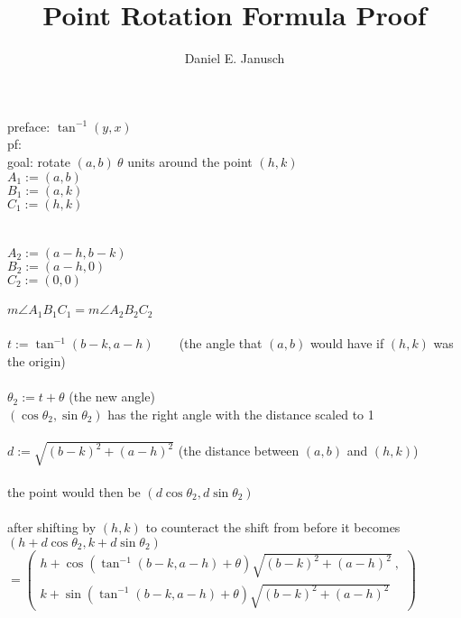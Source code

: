 \documentclass[12pt]{article}
\begin{document}
\addtolength{\topmargin}{-1in}
\title{Point Rotation Formula Proof}
\author{Daniel E. Janusch}
\maketitle
\noindent preface: $\tan^{-1}(y,x)$\\

\noindent pf:\\

\noindent goal: rotate $(a,b)~\theta$ units around the point $(h,k)$\\
$A_1:=(a,b)$\\
$B_1:=(a,k)$\\
$C_1:=(h,k)$\\
\\
\\
$A_2:=(a-h,b-k)$\\
$B_2:=(a-h,0)$\\
$C_2:=(0,0)$\\
\\
$m\angle A_1B_1C_1=m\angle A_2B_2C_2$\\
\\
$t:=\tan^{-1}\left(b-k,a-h\right)$~~~~(the angle that $(a,b)$ would have if $(h,k)$ was the origin)\\
\\
$\theta_2:=t+\theta$ (the new angle)\\$(\cos\theta_2,\sin\theta_2)$ has the right angle with the distance scaled to 1\\
\\
$d:=\sqrt{\left(b-k\right)^2+\left(a-h\right)^2}$ (the distance between $(a,b)$ and $(h,k)$)\\
\\
the point would then be $(d\cos\theta_2,d\sin\theta_2)$\\
\\
after shifting by $(h,k)$ to counteract the shift from before it becomes $(h+d\cos\theta_2,k+d\sin\theta_2)$\\$=\left(\begin{aligned}h+\cos\left(\tan^{-1}\left(b-k,a-h\right)+\theta\right)\sqrt{\left(b-k\right)^2+\left(a-h\right)^2}~,\\
k+\sin\left(\tan^{-1}\left(b-k,a-h\right)+\theta\right)\sqrt{\left(b-k\right)^2+\left(a-h\right)^2}\end{aligned}\right)$\\
\\
\blacksquare
\end{document}
